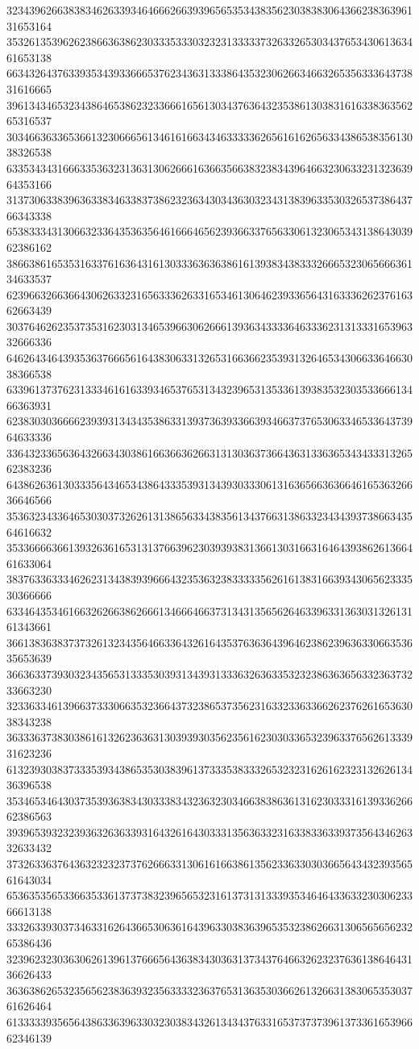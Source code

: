32343962663838346263393464666266393965653534383562303838306436623836396131653164
35326135396262386636386230333533303232313333373263326530343765343061363461653138
66343264376339353439336665376234363133386435323062663466326535633364373831616665
39613434653234386465386232336661656130343763643235386130383161633836356265316537
30346636336536613230666561346161663434633333626561616265633438653835613038326538
63353434316663353632313631306266616366356638323834396466323063323132363964353166
31373063383963633834633837386232363430343630323431383963353032653738643766343338
65383334313066323364353635646166646562393663376563306132306534313864303962386162
38663861653531633761636431613033363636386161393834383332666532306566636134633537
62396632663664306263323165633362633165346130646239336564316333626237616362663439
30376462623537353162303134653966306266613936343333646333623131333165396332666336
64626434643935363766656164383063313265316636623539313264653430663364663038366538
63396137376231333461616339346537653134323965313533613938353230353366613466363931
62383030366662393931343435386331393736393366393466373765306334653364373964633336
33643233656364326634303861663663626631313036373664363133636534343331326562383236
64386263613033356434653438643335393134393033306131636566363664616536326636646566
35363234336465303037326261313865633438356134376631386332343439373866343564616632
35336666366139326361653131376639623039393831366130316631646439386261366461633064
38376336333462623134383939666432353632383333356261613831663934306562333530366666
63346435346166326266386266613466646637313431356562646339633136303132613161343661
36613836383737326132343564663364326164353763636439646238623963633066353635653639
36636337393032343565313335303931343931333632636335323238636365633236373233663230
32336334613966373330663532366437323865373562316332336336626237626165363038343238
36333637383038616132623636313039393035623561623030336532396337656261333931623236
61323930383733353934386535303839613733353833326532323162616232313262613436396538
35346534643037353936383430333834323632303466383863613162303331613933626662386563
39396539323239363263633931643261643033313563633231633833633937356434626332633432
37326336376436323232373762666331306161663861356233633030366564343239356561643034
65363535653366353361373738323965653231613731313339353464643363323030623366613138
33326339303734633162643665306361643963303836396535323862663130656565623265386436
32396232303630626139613766656436383430363137343764663262323763613864643136626433
36363862653235656238363932356333323637653136353036626132663138306535303761626464
61333339356564386336396330323038343261343437633165373737396137336165396662346139
